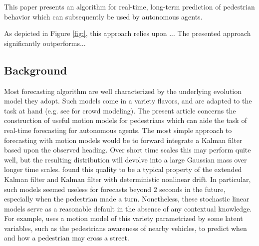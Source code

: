\documentclass[conference]{IEEEtran}
\begin{document}
This paper presents an algorithm for real-time, long-term prediction of pedestrian behavior which can subsequently be used by autonomous agents.

As depicted in Figure \ref{fig:}, this approach relies upon ... 
The presented approach significantly outperforms...


\subsection{Background}
Most forecasting algorithm are well characterized by the underlying evolution model they adopt.
Such models come in a variety flavors, and are adapted to the task at hand (e.g. see \cite{Helbing1992} for crowd modeling).
The present article concerns the construction of useful motion models for pedestrians which can aide the task of real-time forecasting for autonomous agents.
The most simple approach to forecasting with motion models would be to forward integrate a Kalman filter \cite{kalman1960new} based upon the observed heading.
Over short time scales this may perform quite well, but the resulting distribution will devolve into a large Gaussian mass over longer time scales.
\citet{Schneider2013} found this quality to be a typical property of the extended Kalman filter and Kalman filter with deterministic nonlinear drift.
In particular, such models seemed useless for forecasts beyond $2$ seconds in the future, especially when the pedestrian made a turn.
Nonetheless, these stochastic linear models serve as a reasonable default in the absence of any contextual knowledge.
For example, \citet{Kooji2014} uses a motion model of this variety parametrized by some latent variables, such as the pedestrians awareness of nearby vehicles, to predict when and how a pedestrian may cross a street.
\end{document}

